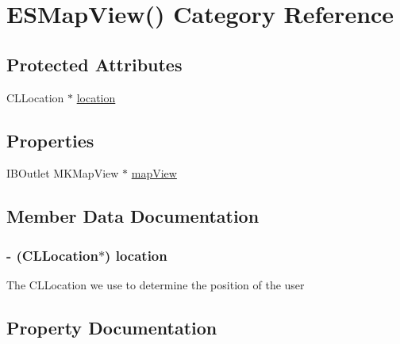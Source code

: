 \hypertarget{category_e_s_map_view_07_08}{}\section{E\+S\+Map\+View() Category Reference}
\label{category_e_s_map_view_07_08}
\subsection*{Protected Attributes}
\begin{DoxyCompactItemize}
\item 
C\+L\+Location $\ast$ \hyperlink{category_e_s_map_view_07_08_a5e3f99f3566ff1acd42673697da6f1e6}{location}
\end{DoxyCompactItemize}
\subsection*{Properties}
\begin{DoxyCompactItemize}
\item 
I\+B\+Outlet M\+K\+Map\+View $\ast$ \hyperlink{category_e_s_map_view_07_08_a90f7e5b2e28913444e25de8297cf4932}{map\+View}
\end{DoxyCompactItemize}


\subsection{Member Data Documentation}
\hypertarget{category_e_s_map_view_07_08_a5e3f99f3566ff1acd42673697da6f1e6}{}
\subsubsection[{location}]{\setlength{\rightskip}{0pt plus 5cm}-\/ (C\+L\+Location$\ast$) location\hspace{0.3cm}{\ttfamily [protected]}}\label{category_e_s_map_view_07_08_a5e3f99f3566ff1acd42673697da6f1e6}
The C\+L\+Location we use to determine the position of the user 

\subsection{Property Documentation}
\hypertarget{category_e_s_map_view_07_08_a90f7e5b2e28913444e25de8297cf4932}{}
